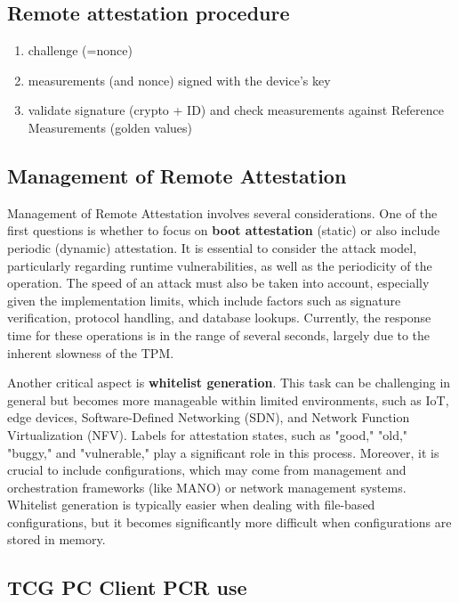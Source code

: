 \subsection{Remote attestation procedure}

\begin{enumerate}
    \item challenge (=nonce)
    \item measurements (and nonce) signed with the device's key
    \item validate signature (crypto + ID) and check measurements against Reference Measurements (golden values)
\end{enumerate}

\subsection{Management of Remote Attestation}

Management of Remote Attestation involves several considerations. One of the first questions is whether to focus on \textbf{boot attestation} (static) or also include periodic (dynamic) attestation. It is essential to consider the attack model, particularly regarding runtime vulnerabilities, as well as the periodicity of the operation. The speed of an attack must also be taken into account, especially given the implementation limits, which include factors such as signature verification, protocol handling, and database lookups. Currently, the response time for these operations is in the range of several seconds, largely due to the inherent slowness of the TPM.

Another critical aspect is \textbf{whitelist generation}. This task can be challenging in general but becomes more manageable within limited environments, such as IoT, edge devices, Software-Defined Networking (SDN), and Network Function Virtualization (NFV). Labels for attestation states, such as "good," "old," "buggy," and "vulnerable," play a significant role in this process. Moreover, it is crucial to include configurations, which may come from management and orchestration frameworks (like MANO) or network management systems. Whitelist generation is typically easier when dealing with file-based configurations, but it becomes significantly more difficult when configurations are stored in memory.

\subsection{TCG PC Client PCR use}

